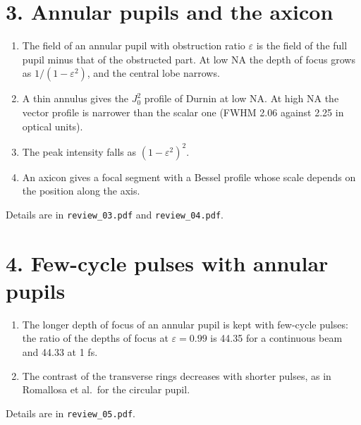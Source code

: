 \documentclass[10pt]{article}
\begin{document}
\section*{3. Annular pupils and the axicon}
\begin{enumerate}
\item The field of an annular pupil with obstruction ratio $\varepsilon$ is the field of the full pupil minus
that of the obstructed part. At low NA the depth of focus grows as $1/(1-\varepsilon^2)$, and the central lobe
narrows.
\item A thin annulus gives the $J_0^2$ profile of Durnin at low NA. At high NA the vector profile is narrower than
the scalar one (FWHM 2.06 against 2.25 in optical units).
\item The peak intensity falls as $(1-\varepsilon^2)^2$.
\item An axicon gives a focal segment with a Bessel profile whose scale depends on the position along the axis.
\end{enumerate}
Details are in \texttt{review\_03.pdf} and \texttt{review\_04.pdf}.

\section*{4. Few-cycle pulses with annular pupils}
\begin{enumerate}
\item The longer depth of focus of an annular pupil is kept with few-cycle pulses: the ratio of the depths of focus
at $\varepsilon = 0.99$ is 44.35 for a continuous beam and 44.33 at 1 fs.
\item The contrast of the transverse rings decreases with shorter pulses, as in Romallosa et al.\ for the circular
pupil.
\end{enumerate}
Details are in \texttt{review\_05.pdf}.
\end{document}

